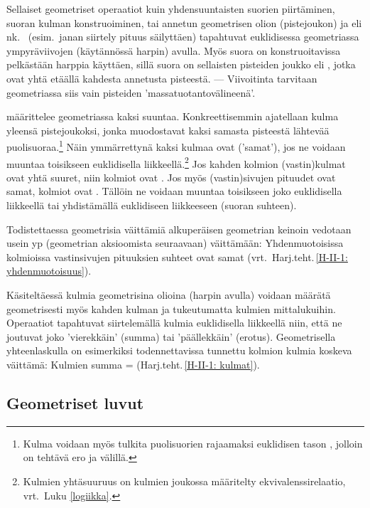 Sellaiset geometriset operaatiot kuin yhdensuuntaisten suorien piirtäminen, suoran kulman
konstruoiminen, tai annetun geometrisen olion (pistejoukon)  ja 
eli nk.\   (esim.\ janan siirtely pituus säilyttäen) tapahtuvat
euklidisessa geometriassa ympyräviivojen (käytännössä harpin) avulla. Myös suora on 
konstruoitavissa pelkästään harppia käyttäen, sillä suora on sellaisten pisteiden joukko
eli , jotka ovat yhtä etäällä kahdesta annetusta pisteestä. --- Viivoitinta 
tarvitaan geometriassa siis vain pisteiden 'massatuotantovälineenä'. 

 määrittelee geometriassa kaksi suuntaa. Konkreettisemmin ajatellaan kulma
yleensä pistejoukoksi, jonka muodostavat kaksi samasta pisteestä lähtevää
puolisuoraa.\footnote[2]{Kulma voidaan myös tulkita puolisuorien rajaamaksi euklidisen
tason , jolloin on tehtävä ero  ja  välillä.}
Näin ymmärrettynä kaksi kulmaa ovat  ('samat'),
jos ne voidaan muuntaa toisikseen euklidisella liikkeellä.\footnote[3]{Kulmien
yhtäsuuruus on kulmien joukossa määritelty ekvivalenssirelaatio, vrt.\ Luku \ref{logiikka}.} 
Jos kahden kolmion (vastin)kulmat ovat yhtä suuret, niin kolmiot ovat .
Jos myös (vastin)sivujen pituudet ovat samat, kolmiot ovat . Tällöin ne
voidaan muuntaa toisikseen joko euklidisella liikkeellä tai yhdistämällä euklidiseen
liikkeeseen  (suoran suhteen).

Todistettaessa geometrisia väittämiä alkuperäisen geometrian keinoin vedotaan usein
yp (geometrian aksioomista seuraavaan) väittämään:
Yhdenmuotoisissa kolmioissa vastinsivujen pituuksien suhteet ovat samat 
(vrt.\ Harj.teht.\,\ref{H-II-1: yhdenmuotoisuus}). 

Käsiteltäessä kulmia geometrisina olioina (harpin avulla) voidaan määrätä geometrisesti
myös kahden kulman  ja  tukeutumatta kulmien mittalukuihin.
Operaatiot tapahtuvat siirtelemällä kulmia euklidisella liikkeellä niin, että ne joutuvat
joko 'vierekkäin' (summa) tai 'päällekkäin' (erotus). Geometrisella yhteenlaskulla on
esimerkiksi todennettavissa tunnettu kolmion kulmia koskeva väittämä: Kulmien summa = 
 (Harj.teht.\,\ref{H-II-1: kulmat}).

\subsection{Geometriset luvut}

